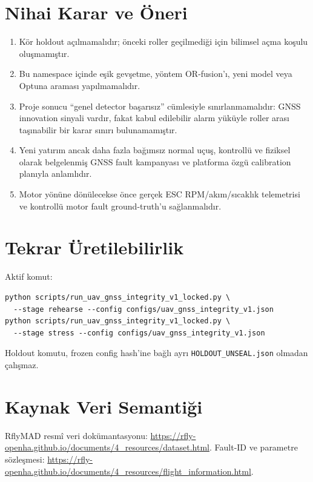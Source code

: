 \documentclass[11pt,a4paper]{article}
\begin{document}
\section{Nihai Karar ve Öneri}
\begin{enumerate}
  \item Kör holdout açılmamalıdır; önceki roller geçilmediği için bilimsel
  açma koşulu oluşmamıştır.
  \item Bu namespace içinde eşik gevşetme, yöntem OR-fusion'ı, yeni model veya
  Optuna araması yapılmamalıdır.
  \item Proje sonucu ``genel detector başarısız'' cümlesiyle sınırlanmamalıdır:
  GNSS innovation sinyali vardır, fakat kabul edilebilir alarm yüküyle
  roller arası taşınabilir bir karar sınırı bulunamamıştır.
  \item Yeni yatırım ancak daha fazla bağımsız normal uçuş, kontrollü ve
  fiziksel olarak belgelenmiş GNSS fault kampanyası ve platforma özgü
  calibration planıyla anlamlıdır.
  \item Motor yönüne dönülecekse önce gerçek ESC RPM/akım/sıcaklık telemetrisi
  ve kontrollü motor fault ground-truth'u sağlanmalıdır.
\end{enumerate}

\section{Tekrar Üretilebilirlik}
Aktif komut:
\begin{verbatim}
python scripts/run_uav_gnss_integrity_v1_locked.py \
  --stage rehearse --config configs/uav_gnss_integrity_v1.json
python scripts/run_uav_gnss_integrity_v1_locked.py \
  --stage stress --config configs/uav_gnss_integrity_v1.json
\end{verbatim}
Holdout komutu, frozen config hash'ine bağlı ayrı
\texttt{HOLDOUT\_UNSEAL.json} olmadan çalışmaz.

\section{Kaynak Veri Semantiği}
RflyMAD resmî veri dokümantasyonu:
\url{https://rfly-openha.github.io/documents/4_resources/dataset.html}.
Fault-ID ve parametre sözleşmesi:
\url{https://rfly-openha.github.io/documents/4_resources/flight_information.html}.
\end{document}

